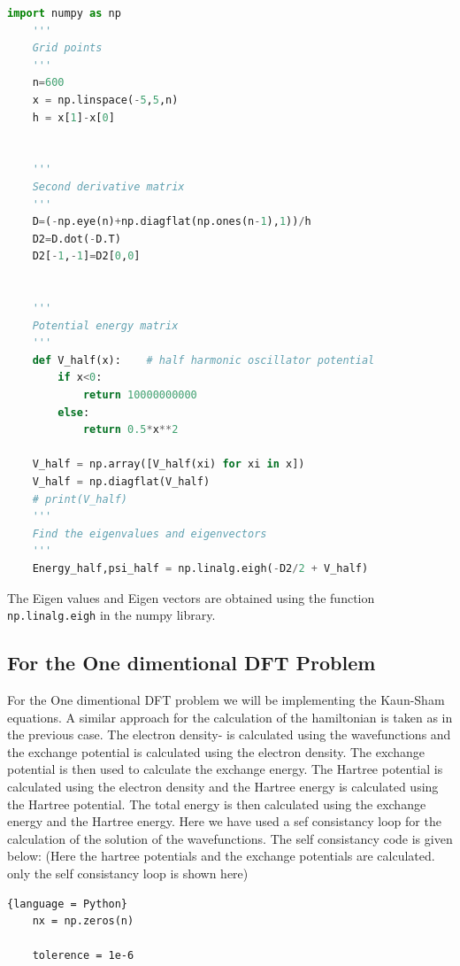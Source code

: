 \documentclass{article}
\begin{document}
\begin{multicols}{2}
\begin{lstlisting}[language=Python]
    import numpy as np
    '''
    Grid points
    '''
    n=600
    x = np.linspace(-5,5,n)
    h = x[1]-x[0] 
    
    
    '''
    Second derivative matrix
    '''
    D=(-np.eye(n)+np.diagflat(np.ones(n-1),1))/h
    D2=D.dot(-D.T)
    D2[-1,-1]=D2[0,0]
    
    
    '''
    Potential energy matrix
    '''
    def V_half(x):    # half harmonic oscillator potential
        if x<0:
            return 10000000000
        else:
            return 0.5*x**2
    
    V_half = np.array([V_half(xi) for xi in x])
    V_half = np.diagflat(V_half)
    # print(V_half)
    '''
    Find the eigenvalues and eigenvectors
    '''
    Energy_half,psi_half = np.linalg.eigh(-D2/2 + V_half)
\end{lstlisting}





The Eigen values and Eigen vectors are obtained using the  function \texttt{np.linalg.eigh} in the numpy library.



\subsection{For the One dimentional DFT Problem}

For the One dimentional DFT problem we will be implementing the Kaun-Sham equations. A similar approach for the calculation of the hamiltonian is taken as in the previous case. The electron density-\cite{vilhena2014construction} is calculated using the wavefunctions and the exchange potential is calculated using the electron density. The exchange potential is then used to calculate the exchange energy. The Hartree potential is calculated using the electron density and the Hartree energy is calculated using the Hartree potential. The total energy is then calculated using the exchange energy and the Hartree energy. Here we have used a sef consistancy loop for the calculation of the solution of the wavefunctions. The self consistancy code is given below: (Here the hartree potentials and the exchange potentials are calculated. only the self consistancy loop is shown here)

\begin{lstlisting}{language = Python}
    nx = np.zeros(n)

    tolerence = 1e-6
    

\end{lstlisting}
\end{multicols}
\end{document}

